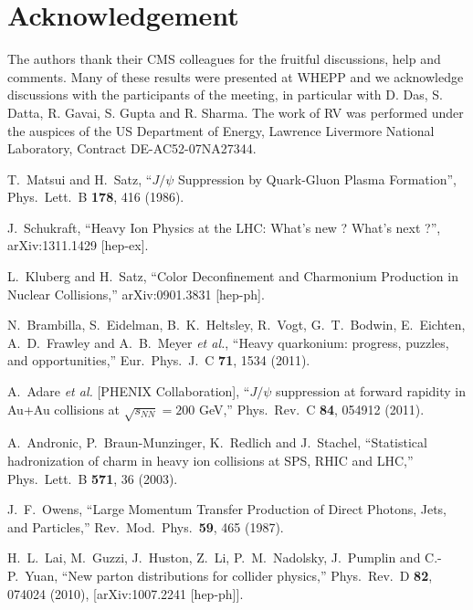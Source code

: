 \documentclass[aps,prc,preprint,superscriptaddress,showpacs,showkeys,amsmath]{revtex4-1}
\begin{document}
 


 \section{Acknowledgement}
  The authors thank their CMS colleagues for the fruitful discussions, 
help and comments. Many of these results were presented at WHEPP and we acknowledge discussions 
with the participants of the meeting, in particular with D. Das, S. Datta, R. Gavai, S. Gupta
and R. Sharma. The work of RV was performed under the auspices of the US Department of Energy, 
Lawrence Livermore National Laboratory, Contract DE-AC52-07NA27344.


\noindent
\begin{thebibliography}{100}
\medskip

 T.~Matsui and H.~Satz,
 ``$J/\psi$ Suppression by Quark-Gluon Plasma Formation'',
 Phys.\ Lett.\ B {\bf 178}, 416 (1986).

  J.~Schukraft,
  ``Heavy Ion Physics at the LHC: What's new ? What's next ?'',
  arXiv:1311.1429 [hep-ex].


  L.~Kluberg and H.~Satz,
  ``Color Deconfinement and Charmonium Production in Nuclear Collisions,''
  arXiv:0901.3831 [hep-ph].

  N.~Brambilla, S.~Eidelman, B.~K.~Heltsley, R.~Vogt, G.~T.~Bodwin, E.~Eichten, A.~D.~Frawley and A.~B.~Meyer {\it et al.},
  ``Heavy quarkonium: progress, puzzles, and opportunities,''
  Eur.\ Phys.\ J.\ C {\bf 71}, 1534 (2011).

  A.~Adare {\it et al.}  [PHENIX Collaboration],
  ``$J/\psi$ suppression at forward rapidity in Au+Au collisions at $\sqrt{s_{NN}}=200$ GeV,''
  Phys.\ Rev.\ C {\bf 84}, 054912 (2011).

  A.~Andronic, P.~Braun-Munzinger, K.~Redlich and J.~Stachel,
  ``Statistical hadronization of charm in heavy ion collisions at SPS, RHIC and LHC,''
  Phys.\ Lett.\ B {\bf 571}, 36 (2003).

  J.~F.~Owens,
  ``Large Momentum Transfer Production of Direct Photons, Jets, and Particles,''
  Rev.\ Mod.\ Phys.\  {\bf 59}, 465 (1987).

  H.~L.~Lai, M.~Guzzi, J.~Huston, Z.~Li, P.~M.~Nadolsky, J.~Pumplin and C.-P.~Yuan,
  ``New parton distributions for collider physics,''
  Phys.\ Rev.\ D {\bf 82}, 074024 (2010),
  [arXiv:1007.2241 [hep-ph]].


\end{thebibliography}
\end{document}
